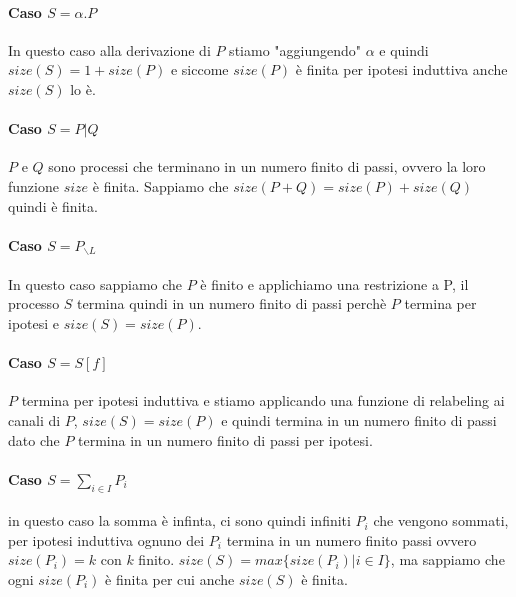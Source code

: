 \documentclass{article}
\newcommand{\pl}{P_{\backslash L}}
\begin{document}
\paragraph{Caso $S=\alpha .P$}
In questo caso alla derivazione di $P$ stiamo "aggiungendo" $\alpha$ e quindi $size(S)=1+size(P)$ e siccome $size(P)$ è finita per ipotesi induttiva anche $size(S)$ lo è.

\paragraph{Caso $S= P|Q$}
$P$ e $Q$ sono processi che terminano in un numero finito di passi, ovvero la loro funzione $size$ è finita. Sappiamo che $size(P+Q)=size(P)+size(Q)$ quindi è finita.

\paragraph{Caso $S=\pl$}
In questo caso sappiamo che $P$ è finito e applichiamo una restrizione a P, il processo $S$ termina quindi in un numero finito di passi perchè $P$ termina per ipotesi e $size(S)=size(P)$.

\paragraph{Caso $S=S[f]$}
$P$ termina per ipotesi induttiva e stiamo applicando una funzione di relabeling ai canali di $P$, $size(S)=size(P)$ e quindi termina in un numero finito di passi dato che $P$ termina in un numero finito di passi per ipotesi.

\paragraph{Caso $S= \sum_{i \in I}P_{i}$}
in questo caso la somma è infinta, ci sono quindi infiniti $P_{i}$ che vengono sommati, per ipotesi induttiva ognuno dei $P_{i}$ termina in un numero finito passi ovvero $size(P_{i})=k$ con $k$ finito. $size(S) = max\{size(P_{i})| i \in I\}$, ma sappiamo che ogni $size(P_{i})$ è finita per cui anche $size(S)$ è finita.\\\\\\\\
\end{document}
